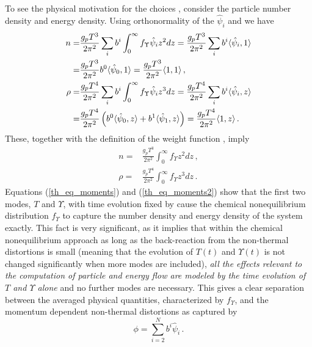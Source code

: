 To see the physical motivation for the choices , consider the particle number density and energy density.  Using orthonormality of the $\hat\psi_i$ and  we have
\begin{align}
n=&\frac{g_pT^3}{2\pi^2}\sum_ib^i\int_0^\infty f_\Upsilon  \hat\psi_i z^2 dz=\frac{g_pT^3}{2\pi^2}\sum_ib^i\langle \hat\psi_i ,1\rangle\\
=&\frac{g_pT^3}{2\pi^2}b^0\langle \hat\psi_0 ,1\rangle=\frac{g_pT^3}{2\pi^2}\langle 1 ,1\rangle\,,\notag\\
\rho=&\frac{g_pT^4}{2\pi^2}\sum_ib^i\int_0^\infty f_\Upsilon  \hat\psi_i z^3 dz=\frac{g_pT^4}{2\pi^2}\sum_ib^i\langle\hat\psi_i, z\rangle\\
=&\frac{g_pT^4}{2\pi^2}\left(b^0\langle\hat\psi_0, z\rangle+b^1\langle\hat\psi_1, z\rangle\right)=
\frac{g_pT^4}{2\pi^2}\langle 1,z\rangle\,.\notag
\end{align}
These, together with the definition of the weight function , imply
\begin{align}\label{th_eq_moments}
n=&\frac{g_pT^3}{2\pi^2}\int_0^\infty f_\Upsilon  z^2dz\,,\\
\label{th_eq_moments2}
\rho=&\frac{g_pT^4}{2\pi^2}\int_0^\infty f_\Upsilon  z^3dz\,.
\end{align}
Equations (\ref{th_eq_moments}) and (\ref{th_eq_moments2}) show  that the first two modes, $T$ and $\Upsilon$, with time evolution fixed by  cause the chemical nonequilibrium distribution $f_\Upsilon $ to capture the number density and energy density of the system exactly.  This fact is very significant, as it implies that within the chemical nonequilibrium approach as long as the back-reaction from the non-thermal distortions is small (meaning that the evolution of $T(t)$ and $\Upsilon(t)$ is not changed significantly when more modes are included), {\em all the effects relevant to the computation of  particle and energy flow are modeled by the time evolution of $T$ and $\Upsilon$ alone} and no further modes are necessary.  This gives a clear separation between the averaged physical quantities, characterized by $f_\Upsilon $, and the momentum dependent non-thermal distortions as captured by 
\begin{equation}
\phi=\sum_{i=2}^N b^i\hat\psi_i\,.
\end{equation}

